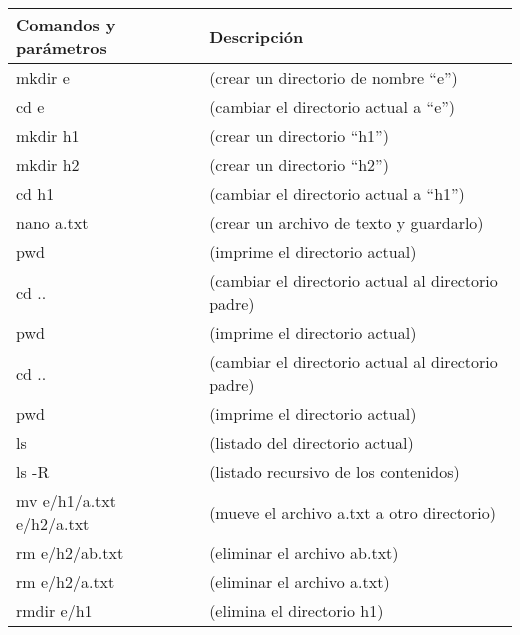\documentclass[12pt]{article}
\begin{document}
\begin{center}
    \begin{tabular}[t]{|l|l|}
    \hline
        \textbf{Comandos y parámetros} & \textbf{Descripción} \\
    \hline
    \hline
        mkdir e & (crear un directorio de nombre “e”) \\
    \hline
        cd e & (cambiar el directorio actual a “e”) \\
    \hline
        mkdir h1 & (crear un directorio “h1”) \\
    \hline
        mkdir h2 & (crear un directorio “h2”) \\
    \hline
        cd h1 & (cambiar el directorio actual a “h1”) \\
    \hline
        nano a.txt & (crear un archivo de texto y guardarlo) \\
    \hline
        pwd & (imprime el directorio actual) \\
    \hline
        cd .. & (cambiar el directorio actual al directorio padre) \\
    \hline
        pwd & (imprime el directorio actual) \\
    \hline
        cd .. & (cambiar el directorio actual al directorio padre) \\
    \hline
        pwd & (imprime el directorio actual) \\
    \hline
        ls & (listado del directorio actual) \\
    \hline
        ls -R & (listado recursivo de los contenidos) \\
    \hline
        mv e/h1/a.txt e/h2/a.txt & (mueve el archivo a.txt a otro directorio) \\
    \hline
        rm e/h2/ab.txt & (eliminar el archivo ab.txt) \\
    \hline
        rm e/h2/a.txt & (eliminar el archivo a.txt) \\
    \hline
        rmdir e/h1 & (elimina el directorio h1)\\
    \hline
    \end{tabular}

\end{center}
\end{document}
